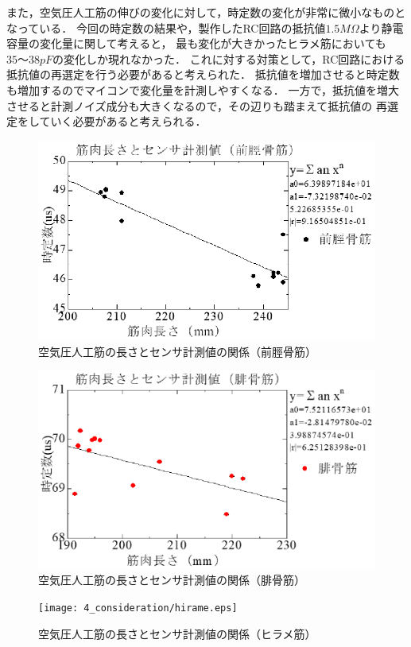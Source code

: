 また，空気圧人工筋の伸びの変化に対して，時定数の変化が非常に微小なものとなっている．
今回の時定数の結果や，製作したRC回路の抵抗値$1.5M\Omega$より静電容量の変化量に関して考えると，
最も変化が大きかったヒラメ筋においても$35～38pF$の変化しか現れなかった．
これに対する対策として，RC回路における抵抗値の再選定を行う必要があると考えられた．
抵抗値を増加させると時定数も増加するのでマイコンで変化量を計測しやすくなる．
一方で，抵抗値を増大させると計測ノイズ成分も大きくなるので，その辺りも踏まえて抵抗値の
再選定をしていく必要があると考えられる．

\begin{figure}[h]
    \begin{center}
        \includegraphics[width=0.78\columnwidth,clip]{4_consideration/zenkei.eps}
    \end{center}
    \caption{空気圧人工筋の長さとセンサ計測値の関係（前脛骨筋）}
    \label{ml-rc1}
\end{figure}

\begin{figure}[h]
    \begin{center}
        \includegraphics[width=0.78\columnwidth,clip]{4_consideration/hikotsu.eps}
    \end{center}
    \caption{空気圧人工筋の長さとセンサ計測値の関係（腓骨筋）}
    \label{ml-rc2}
\end{figure}

\begin{figure}[h]
    \begin{center}
        \texttt{[image: 4\_consideration/hirame.eps]}
    \end{center}
    \caption{空気圧人工筋の長さとセンサ計測値の関係（ヒラメ筋）}
    \label{ml-rc3}
\end{figure}
